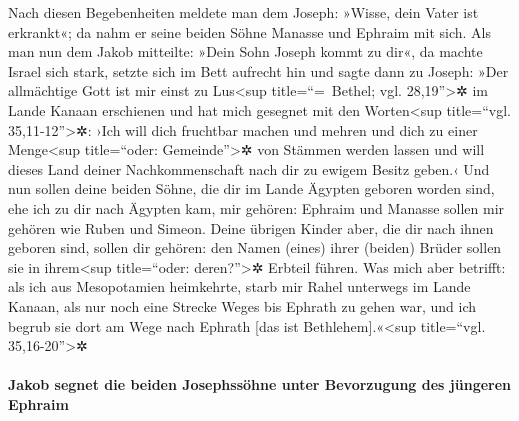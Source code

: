  Nach diesen Begebenheiten meldete man dem Joseph: »Wisse,
dein Vater ist erkrankt«; da nahm er seine beiden Söhne Manasse und
Ephraim mit sich.  Als man nun dem Jakob mitteilte: »Dein
Sohn Joseph kommt zu dir«, da machte Israel sich stark, setzte sich im
Bett aufrecht hin  und sagte dann zu Joseph: »Der
allmächtige Gott ist mir einst zu Lus\textless sup title=``=~Bethel;
vgl. 28,19''\textgreater✲ im Lande Kanaan erschienen und hat mich
gesegnet  mit den Worten\textless sup title=``vgl.
35,11-12''\textgreater✲: ›Ich will dich fruchtbar machen und mehren und
dich zu einer Menge\textless sup title=``oder: Gemeinde''\textgreater✲
von Stämmen werden lassen und will dieses Land deiner Nachkommenschaft
nach dir zu ewigem Besitz geben.‹  Und nun sollen deine
beiden Söhne, die dir im Lande Ägypten geboren worden sind, ehe ich zu
dir nach Ägypten kam, mir gehören: Ephraim und Manasse sollen mir
gehören wie Ruben und Simeon.  Deine übrigen Kinder aber,
die dir nach ihnen geboren sind, sollen dir gehören: den Namen (eines)
ihrer (beiden) Brüder sollen sie in ihrem\textless sup title=``oder:
deren?''\textgreater✲ Erbteil führen.  Was mich aber
betrifft: als ich aus Mesopotamien heimkehrte, starb mir Rahel unterwegs
im Lande Kanaan, als nur noch eine Strecke Weges bis Ephrath zu gehen
war, und ich begrub sie dort am Wege nach Ephrath {[}das ist
Bethlehem{]}.«\textless sup title=``vgl. 35,16-20''\textgreater✲

\hypertarget{jakob-segnet-die-beiden-josephssuxf6hne-unter-bevorzugung-des-juxfcngeren-ephraim}{%
\paragraph{Jakob segnet die beiden Josephssöhne unter Bevorzugung des
jüngeren
Ephraim}\label{jakob-segnet-die-beiden-josephssuxf6hne-unter-bevorzugung-des-juxfcngeren-ephraim}}

